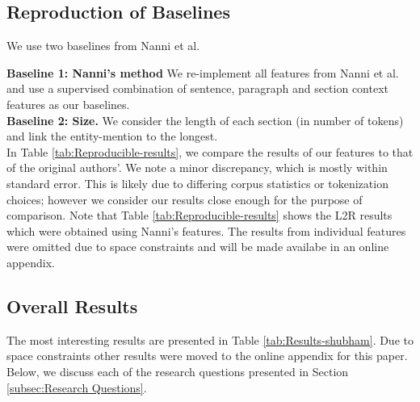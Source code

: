\subsection{Reproduction of Baselines}
\label{subsec:Reproduction of Baselines}

We use two baselines from Nanni et al.

\noindent
\textbf{Baseline 1: Nanni's method} We re-implement all features from Nanni et al. \cite{nanni2018entity} and use a supervised combination of sentence, paragraph and section context features as our baselines. \\
\textbf{Baseline 2: Size.} We consider the length of each section (in number of tokens) and link the entity-mention to the longest. \\


In Table \ref{tab:Reproducible-results}, we compare the results of our features to that of the original authors'. We note a minor discrepancy, which is mostly within standard error. This is likely due to differing corpus statistics or tokenization choices; however we consider our results close enough for the purpose of comparison. Note that Table \ref{tab:Reproducible-results} shows the L2R results which were obtained using Nanni's features. The results from individual features were omitted due to space constraints and will be made availabe in an online appendix.


\subsection{Overall Results}
\label{subsec:Results}
The most interesting results are presented in Table \ref{tab:Results-shubham}. Due to space constraints other results were moved to the online appendix for this paper. Below, we discuss each of the research questions presented in Section \ref{subsec:Research Questions}.


